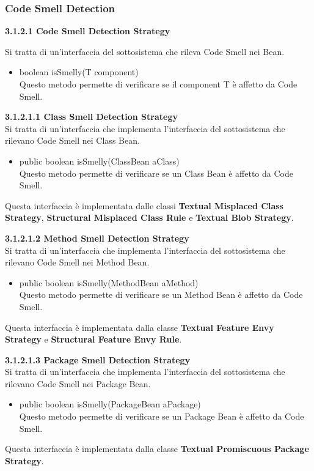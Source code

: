 \documentclass[11pt]{article}
\begin{document}
	\subsubsection{Code Smell Detection}
			\begin{description}
			\item \textbf{3.1.2.1  Code Smell Detection Strategy}
			\item Si tratta di un'interfaccia del sottosistema che rileva Code Smell nei Bean.
			
			\begin{itemize}
				\item boolean isSmelly(T component)\\
				Questo metodo permette di verificare se il component T è affetto da Code Smell.				
			\end{itemize}
			\item \textbf{ 3.1.2.1.1  Class Smell Detection Strategy}\\
			Si tratta di un'interfaccia che implementa l'interfaccia del sottosistema che rilevano Code Smell nei Class Bean.
			\begin{itemize}
				\item public boolean isSmelly(ClassBean aClass)\\
				Questo metodo permette di verificare se un Class Bean è affetto da Code Smell.				
			\end{itemize}
			Questa interfaccia è implementata dalle classi \textbf{Textual Misplaced Class Strategy}, \textbf{Structural Misplaced Class Rule} e \textbf{Textual Blob Strategy}.
			\item \textbf{ 3.1.2.1.2  Method Smell Detection Strategy}\\
			Si tratta di un'interfaccia che implementa l'interfaccia del sottosistema che rilevano Code Smell nei Method Bean.
			\begin{itemize}
				\item public boolean isSmelly(MethodBean aMethod)\\
				Questo metodo permette di verificare se un Method Bean è affetto da Code Smell.				
			\end{itemize}
			Questa interfaccia è implementata dalla classe \textbf{Textual Feature Envy Strategy} e \textbf{Structural Feature Envy Rule}.
		
			\item \textbf{ 3.1.2.1.3  Package Smell Detection Strategy}\\
			Si tratta di un'interfaccia che implementa l'interfaccia del sottosistema che rilevano Code Smell nei Package Bean.		
			\begin{itemize}
				\item public boolean isSmelly(PackageBean aPackage)\\
				Questo metodo permette di verificare se un Package Bean è affetto da Code Smell.				
			\end{itemize}
			Questa interfaccia è implementata dalla classe \textbf{Textual Promiscuous Package Strategy}.
			

\end{description}
\end{document}
